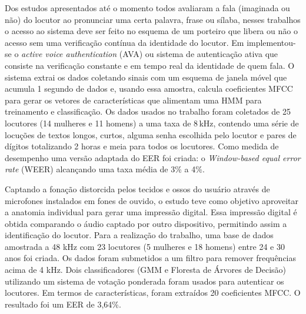 			\par Dos estudos apresentados até o momento todos avaliaram a fala (imaginada ou não) do locutor ao pronunciar uma certa palavra, frase ou sílaba, nesses trabalhos o acesso ao sistema deve ser feito no esquema de um porteiro que libera ou não o acesso sem uma verificação contínua da identidade do locutor. Em  implementou-se o \textit{active voice authentication} (AVA) ou sistema de autenticação ativa que consiste na verificação constante e em tempo real da identidade de quem fala. O sistema extrai os dados coletando sinais com um esquema de janela móvel que acumula 1 segundo de dados e, usando essa amostra, calcula coeficientes MFCC para gerar os vetores de características que alimentam uma HMM para treinamento e classificação. Os dados usados no trabalho foram coletados de 25 locutores (14 mulheres e 11 homens) a uma taxa de 8\,kHz, contendo uma série de locuções de textos longos, curtos, alguma senha escolhida pelo locutor e pares de dígitos totalizando 2 horas e meia para todos os locutores. Como medida de desempenho uma versão adaptada do EER foi criada: o \textit{Window-based equal error rate} (WEER) alcançando uma taxa média de 3\% a 4\%.
			
			\par Captando a fonação distorcida pelos tecidos e ossos do usuário através de microfones instalados em fones de ouvido, o estudo \cite{10.1145/3448113} teve como objetivo aproveitar a anatomia individual para gerar uma impressão digital. Essa impressão digital é obtida comparando o áudio captado por outro dispositivo, permitindo assim a identificação do locutor. Para a realização do trabalho, uma base de dados amostrada a 48 kHz com 23 locutores (5 mulheres e 18 homens) entre 24 e 30 anos foi criada. Os dados foram submetidos a um filtro para remover frequências acima de 4 kHz. Dois classificadores (GMM e Floresta de Árvores de Decisão) utilizando um sistema de votação ponderada foram usados para autenticar os locutores. Em termos de características, foram extraídos 20 coeficientes MFCC. O resultado foi um EER de 3,64\%.
			
